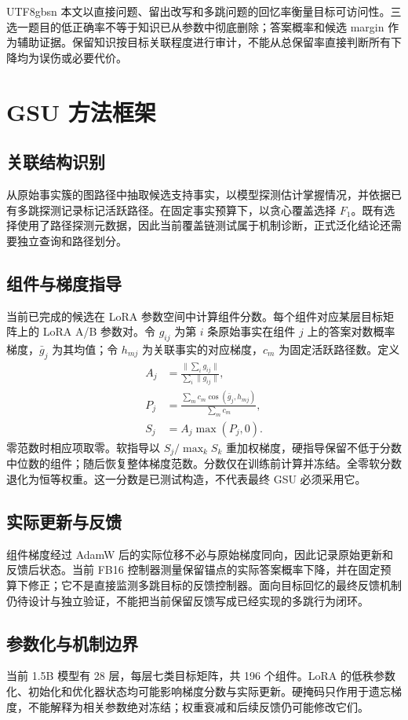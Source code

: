\documentclass[sigconf,anonymous,review]{acmart}
\begin{document}
\begin{CJK*}{UTF8}{gbsn}
本文以直接问题、留出改写和多跳问题的回忆率衡量目标可访问性。三选一题目的低正确率不等于知识已从参数中彻底删除；答案概率和候选 margin 作为辅助证据。保留知识按目标关联程度进行审计，不能从总保留率直接判断所有下降均为误伤或必要代价。

\section{GSU 方法框架}
\subsection{关联结构识别}
从原始事实簇的图路径中抽取候选支持事实，以模型探测估计掌握情况，并依据已有多跳探测记录标记活跃路径。在固定事实预算下，以贪心覆盖选择 $F_1$。既有选择使用了路径探测元数据，因此当前覆盖链测试属于机制诊断，正式泛化结论还需要独立查询和路径划分。

\subsection{组件与梯度指导}
当前已完成的候选在 LoRA 参数空间中计算组件分数。每个组件对应某层目标矩阵上的 LoRA A/B 参数对。令 $g_{ij}$ 为第 $i$ 条原始事实在组件 $j$ 上的答案对数概率梯度，$\bar g_j$ 为其均值；令 $h_{mj}$ 为关联事实的对应梯度，$c_m$ 为固定活跃路径数。定义
\begin{align}
 A_j &= \frac{\|\sum_i g_{ij}\|}{\sum_i\|g_{ij}\|},\\
 P_j &= \frac{\sum_m c_m\cos(\bar g_j,h_{mj})}{\sum_m c_m},\\
 S_j &= A_j\max(P_j,0).
\end{align}
零范数时相应项取零。软指导以 $S_j/\max_k S_k$ 重加权梯度，硬指导保留不低于分数中位数的组件；随后恢复整体梯度范数。分数仅在训练前计算并冻结。全零软分数退化为恒等权重。这一分数是已测试构造，不代表最终 GSU 必须采用它。

\subsection{实际更新与反馈}
组件梯度经过 AdamW 后的实际位移不必与原始梯度同向，因此记录原始更新和反馈后状态。当前 FB16 控制器测量保留锚点的实际答案概率下降，并在固定预算下修正；它不是直接监测多跳目标的反馈控制器。面向目标回忆的最终反馈机制仍待设计与独立验证，不能把当前保留反馈写成已经实现的多跳行为闭环。

\subsection{参数化与机制边界}
当前 1.5B 模型有 28 层，每层七类目标矩阵，共 196 个组件。LoRA 的低秩参数化、初始化和优化器状态均可能影响梯度分数与实际更新。硬掩码只作用于遗忘梯度，不能解释为相关参数绝对冻结；权重衰减和后续反馈仍可能修改它们。


\end{CJK*}
\end{document}
